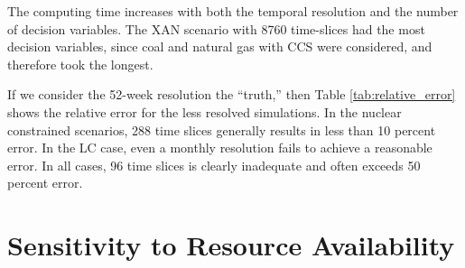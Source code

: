 The computing time increases with both the temporal resolution and the number of
decision variables. The XAN scenario with 8760 time-slices had the most decision
variables, since coal and natural gas with CCS were considered, and therefore took
the longest.

If we consider the 52-week resolution the ``truth,'' then Table \ref{tab:relative_error}
shows the relative error for the less resolved simulations. In the nuclear constrained
scenarios, 288 time slices generally results in less than 10 percent error. In the
LC case, even a monthly resolution fails to achieve a reasonable error. In all cases,
96 time slices is clearly inadequate and often exceeds 50 percent error.

\begin{table}[H]
  \centering
  \caption{Difference Between Time Resolutions as a Percentage of the 365-day resolution}
  \label{tab:relative_error}
\end{table}

\section{Sensitivity to Resource Availability}


